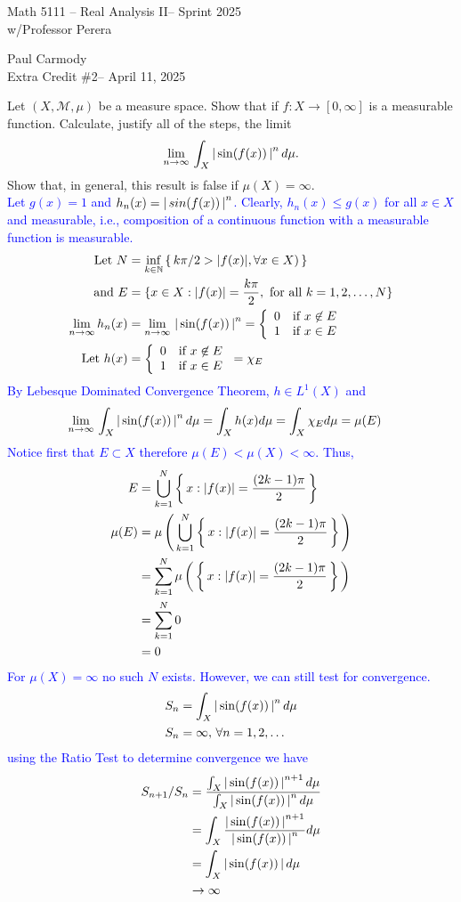 \documentclass[10pt,a4paper]{report}
\newcommand{\CLASSNAME}{Math 5111 -- Real Analysis II}
\newcommand{\STUDENTNAME}{Paul Carmody}
\newcommand{\ASSIGNMENT}{Extra Credit \#2}
\newcommand{\DUEDATE}{April 11, 2025}
\newcommand{\SEMESTER}{Sprint 2025}
\newcommand{\BLUE}[1]{\textcolor{blue}{#1}}
\begin{document}
\begin{center}
	\Large{\CLASSNAME -- \SEMESTER} \\
	\large{ w/Professor Perera}
\end{center}
\begin{center}
	\STUDENTNAME \\
	\ASSIGNMENT -- \DUEDATE\\
\end{center} 

Let $(X, \mathcal{M}, \mu)$ be a measure space. Show that if $f: X \to [0,\infty]$ is a measurable function.  Calculate, justify all of the steps, the limit
\begin{align*}
	\underset{n \to \infty}\lim\, \int_X \left |\, \sin(f(x)) \,\right |^n d\mu.
\end{align*}Show that, in general, this result is false if $\mu(X) = \infty$.\\

\BLUE{Let $g(x) = 1$ and $h_n(x) = \left |\, sin(f(x)) \,\right |^n$.  Clearly, $h_n(x) \le g(x)$ for all $x \in X$ and measurable, i.e., composition of a continuous function with a measurable function is measurable.  
\begin{align*}
	\text{Let } N &= \inf_{k \in \mathbb{N}}\left \{\, k\pi/2 > |f(x)|, \forall x\in X) \,\right \}\\
	\text{ and } E &= \{x \in X: |f(x)| = \frac{k\pi}{2},\text{ for all }k = 1, 2, \dots, N \}\\
	\underset{n \to \infty}\lim\, h_n(x) &= \underset{n \to \infty}\lim\, \left |\, \sin(f(x)) \,\right |^n = \left \{ \begin{array}{ll} 0 & \text{if } x \not\in E\\ 1 & \text{if } x \in E \end{array} \right . \\
	\text{Let } h(x) &= \left \{ \begin{array}{ll} 0 & \text{if } x \not\in E\\ 1 & \text{if } x \in E \end{array} \right . = \chi_E
\end{align*}By Lebesque Dominated Convergence Theorem, $h \in L^1(X)$ and 
\begin{align*}
	\underset{n \to \infty}\lim\, \int_X \left |\, \sin(f(x)) \,\right |^n d\mu &= \int_X h(x) d\mu = \int_X \chi_E d\mu = \mu(E)
\end{align*}Notice first that $E \subset X$ therefore $\mu(E) < \mu(X) < \infty$.  Thus,
\begin{align*}
	E &= \bigcup_{k=1}^N \left \{\,  x : |f(x)|= \frac{(2k-1)\pi}{2} \,\right \} \\
	\mu(E) &= \mu\left (\, \bigcup_{k=1}^N \left \{\,  x : |f(x)|= \frac{(2k-1)\pi}{2} \,\right \} \,\right )\\
	 &= \sum_{k=1}^N \mu\left (\, \left \{\,  x : |f(x)|= \frac{(2k-1)\pi}{2} \,\right \} \,\right )\\
	 &= \sum_{k=1}^N 0\\
	 &= 0
\end{align*}For $\mu(X) = \infty$ no such $N$ exists.  However, we can still test for convergence.
\begin{align*}
	S_n &= \int_X \left |\, \sin(f(x)) \,\right |^n d\mu \\
	S_n &= \infty, \, \forall n=1, 2, \dots 
\end{align*}using the Ratio Test to determine convergence we have 
\begin{align*}
	S_{n+1}/S_n &= \frac{\int_X \left |\, \sin(f(x)) \,\right |^{n+1} d\mu}{\int_X \left |\, \sin(f(x)) \,\right |^n d\mu} \\
	&= \int_X \frac{\left |\, \sin(f(x)) \,\right |^{n+1}}{\left |\, \sin(f(x)) \,\right |^n} d\mu \\
	&= \int_X \left |\, \sin(f(x)) \,\right | d\mu \\
	&\to \infty
\end{align*}
}
\end{document}

